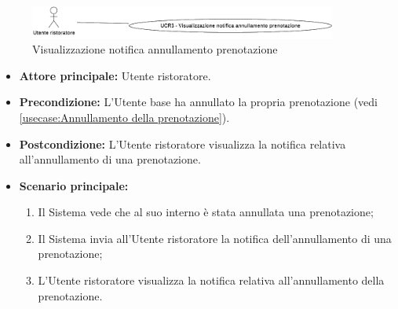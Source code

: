 \newpage
{}
\label{usecase:Visualizzazione notifica annullamento prenotazione}

\begin{figure}[h]
	\centering
	\includegraphics[width=0.9\textwidth]{./uml/UCR3.png} 
	\caption{Visualizzazione notifica annullamento prenotazione}
	\label{fig:UCR3}
  \end{figure}

\begin{itemize}
	\item \textbf{Attore principale:} Utente ristoratore.

	\item \textbf{Precondizione:} L'Utente base ha annullato la propria prenotazione (vedi \autoref{usecase:Annullamento della prenotazione}).

	\item \textbf{Postcondizione:} L'Utente ristoratore visualizza la notifica relativa all'annullamento di una prenotazione.

	\item \textbf{Scenario principale:}
	      \begin{enumerate}
		      \item Il Sistema vede che al suo interno è stata annullata una prenotazione;
		      \item Il Sistema invia all'Utente ristoratore la notifica dell'annullamento di una prenotazione;
		      \item L'Utente ristoratore visualizza la notifica relativa all'annullamento della prenotazione.
	      \end{enumerate}
\end{itemize}
